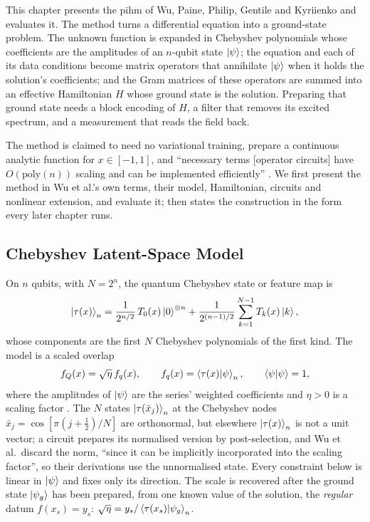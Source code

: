 This chapter presents the \gls{pihm} of Wu, Paine, Philip, Gentile and Kyriienko \cite{wu2025pihm} and evaluates it. The method turns a differential equation into a ground-state problem. The unknown function is expanded in Chebyshev polynomials whose coefficients are the amplitudes of an $n$-qubit state $\ket{\psi}$; the equation and each of its data conditions become matrix operators that annihilate $\ket{\psi}$ when it holds the solution's coefficients; and the Gram matrices of these operators are summed into an effective Hamiltonian $H$ whose ground state is the solution. Preparing that ground state needs a block encoding of $H$, a filter that removes its excited spectrum, and a measurement that reads the field back.

The method is claimed to need no variational training, prepare a continuous analytic function for $x\in[-1,1]$, and ``necessary terms [operator circuits] have $O(\mathrm{poly}(n))$ scaling and can be implemented efficiently'' \cite{wu2025pihm}. We first present the method in Wu et al.'s own terms, their model, Hamiltonian, circuits and nonlinear extension, and evaluate it;  then states the construction in the form every later chapter runs.

\subsection{Chebyshev Latent-Space Model}
\label{sec:pihm-model}

On $n$ qubits, with $N=2^n$, the quantum Chebyshev state or feature map is
\begin{equation}
    \ket{\tau(x)}_n = \frac{1}{2^{n/2}}\,T_0(x)\ket{0}^{\otimes n} + \frac{1}{2^{(n-1)/2}}\sum_{k=1}^{N-1} T_k(x)\ket{k},
    \label{eq:pihm-chebyshev-feature-map}
\end{equation}
whose components are the first $N$ Chebyshev polynomials of the first kind. The model is a scaled overlap
\begin{equation}
    f_Q(x) = \sqrt{\eta}\,f_q(x), \qquad f_q(x) = \braket{\tau(x)|\psi}_n, \qquad \braket{\psi|\psi}=1,
    \label{eq:pihm-fq}
\end{equation}
where the amplitudes of $\ket{\psi}$ are the series' weighted coefficients and $\eta>0$ is a scaling factor \cite{paine2023physicsinformed,wu2025pihm}. The $N$ states $\ket{\tau(\bar x_j)}_n$ at the Chebyshev nodes $\bar x_j=\cos[\pi(j+\tfrac12)/N]$ are orthonormal, but elsewhere $\ket{\tau(x)}_n$ is not a unit vector; a circuit prepares its normalised version by post-selection, and Wu et al.\ discard the norm, ``since it can be implicitly incorporated into the scaling factor'', so their derivations use the unnormalised state. Every constraint below is linear in $\ket{\psi}$ and fixes only its direction. The scale is recovered after the ground state $\ket{\psi_g}$ has been prepared, from one known value of the solution, the \emph{regular} datum $f(x_s)=y_s$: $\sqrt{\eta}=y_s/\braket{\tau(x_s)|\psi_g}_n$.


